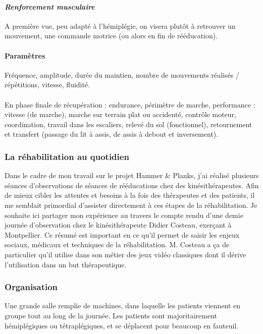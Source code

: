 	\paragraph{\emph{Renforcement musculaire} \\ }
A première vue, peu adapté à l’hémiplégie, on visera plutôt à retrouver un mouvement, une commande motrice (ou alors en fin de rééducation).

	\paragraph{Paramètres \\}
Fréquence, amplitude, durée du maintien, nombre de mouvements réalisés / répétitions, vitesse, fluidité.

\paragraph{}En phase finale de récupération : endurance, périmètre de marche, performance : vitesse (de marche), marche sur terrain plat ou accidenté, contrôle moteur, coordination, travail dans les escaliers, relevé du sol (fonctionnel), retournement et transfert (passage du lit à assis, de assis à debout et inversement).

	\subsubsection{La réhabilitation au quotidien}
Dans le cadre de mon travail sur le projet Hammer \& Planks, j'ai réalisé plusieurs séances d'observations de séances de rééducations chez des kinésithérapeutes. Afin de mieux cibler les attentes et besoins à la fois des thérapeutes et des patients, il me semblait primordial d'assister directement à ces étapes de la réhabilitation. Je souhaite ici partager mon expérience au travers le compte rendu d'une demie journée d'observation chez le kinésithérapeute Didier Costeau, exerçant à Montpellier. Ce résumé est important en ce qu'il permet de saisir les enjeux sociaux, médicaux et techniques de la réhabilitation. M. Costeau a ça de particulier qu'il utilise dans son métier des jeux vidéo classiques dont il dérive l'utilisation dans un but thérapeutique.

	\subsubsection*{Organisation}
Une grande salle remplie de machines, dans laquelle les patients viennent en groupe tout au long de la journée. Les patients sont majoritairement hémiplégiques ou tétraplégiques, et se déplacent pour beaucoup en fauteuil.

